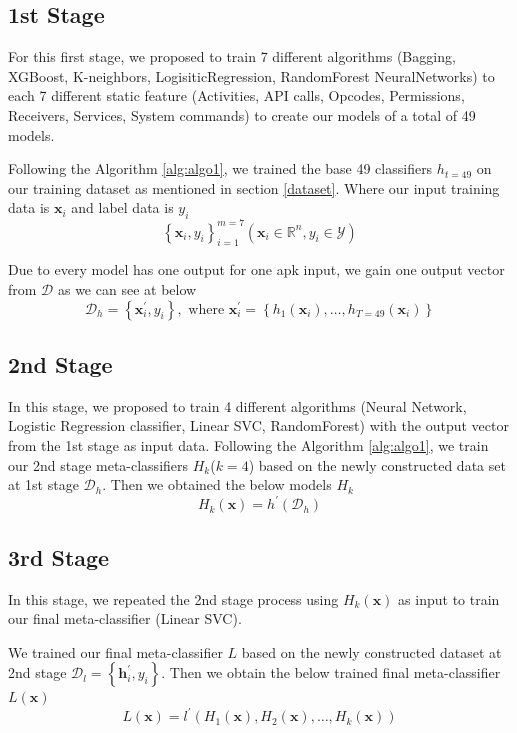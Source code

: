 \subsection{1st Stage}
For this first stage, we proposed to train 7 different algorithms (Bagging, XGBoost, K-neighbors, LogisiticRegression, RandomForest NeuralNetworks) to each 7 different static feature (Activities, API calls, Opcodes, Permissions, Receivers, Services, System commands) to create our models of a total of 49 models. 

Following the Algorithm \ref{alg:algo1}, we trained the base 49 classifiers $h_{t=49}$ on our training dataset as mentioned in section \ref{dataset}. Where our input training data is $\mathbf{x}_{i}$ and label data is $y_{i}$
 $$\left\{\mathbf{x}_{i}, y_{i}\right\}_{i=1}^{m=7}\left(\mathbf{x}_{i} \in \mathbb{R}^{n}, y_{i} \in \mathcal{Y}\right)$$


Due to every model has one output for one \ac{apk} input, we gain one output vector from $\mathcal{D}$ as we can see at below $$\mathcal{D}_h = \left\{\mathbf{x}_{i}^{\prime}, y_{i}\right\}, \text { where } \mathbf{x}_{i}^{\prime}=\left\{h_{1}\left(\mathbf{x}_{i}\right), \ldots, h_{T=49}\left(\mathbf{x}_{i}\right)\right\}$$

\subsection{2nd Stage}
In this stage, we proposed to train 4 different algorithms (Neural Network, Logistic Regression classifier, Linear SVC, RandomForest) with the output vector from the 1st stage as input data.
Following the Algorithm \ref{alg:algo1}, we train our 2nd stage meta-classifiers $H_{k}$($k=4$) based on the newly constructed data set at 1st stage $\mathcal{D}_h$. Then we obtained the below models $H_{k}$
$$H_{k}(\mathbf{x})=h^{\prime}\left(\mathcal{D}_h\right)$$



\subsection{3rd Stage}
In this stage, we repeated the 2nd stage process using $H_{k}\left(\mathbf{x}\right)$ as input to train our final meta-classifier (Linear SVC).

We trained our final meta-classifier $L$ based on the newly constructed dataset at 2nd stage $\mathcal{D}_l = \left\{\mathbf{h}_{i}^{\prime}, y_{i}\right\}$. Then we obtain the below trained final meta-classifier $L\left(\mathbf{x}\right)$
$$L(\mathbf{x})=l^{\prime}\left(H_{1}(\mathbf{x}), H_{2}(\mathbf{x}), \ldots, H_{k}(\mathbf{x})\right)$$




